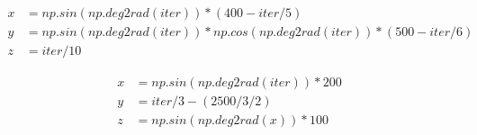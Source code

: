 \begin{equation}\label{eq2}
\begin{split}
x &= np.sin(np.deg2rad(iter)) * (400-iter / 5)\\
y &= np.sin(np.deg2rad(iter)) * np.cos(np.deg2rad(iter)) * (500-iter / 6)\\
z &= iter / 10
\end{split}
\end{equation}

\begin{equation}\label{eq3}
\begin{split}
x &= np.sin(np.deg2rad(iter)) * 200\\
y &= iter / 3 - (2500/3/2)\\
z &= np.sin(np.deg2rad(x))*100
\end{split}
\end{equation}


